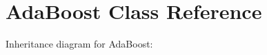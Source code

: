 \hypertarget{classAdaBoost}{}\section{Ada\+Boost Class Reference}
\label{classAdaBoost}


Inheritance diagram for Ada\+Boost\+:
